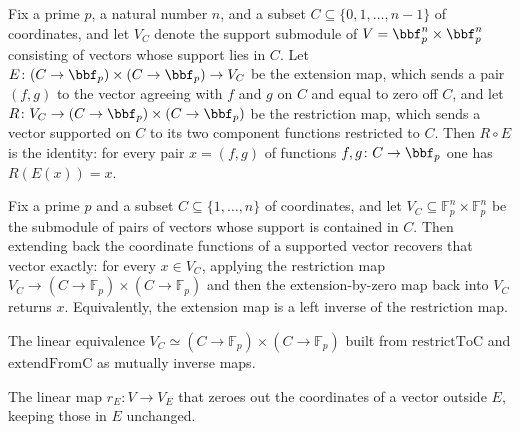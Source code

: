 \begin{lemma}
\label{restrictToC_extendFromC}
\leanok
{}
Fix a prime $p$, a natural number $n$, and a subset $C \subseteq \{0,1,\dots,n-1\}$ of
coordinates, and let $V_C$ denote the support submodule of $V = \bbf_p^n \times
\bbf_p^n$ consisting of vectors whose support lies in $C$. Let $E \colon (C \to \bbf_p)
\times (C \to \bbf_p) \to V_C$ be the extension map, which sends a pair $(f,g)$ to the
vector agreeing with $f$ and $g$ on $C$ and equal to zero off $C$, and let $R \colon V_C
\to (C \to \bbf_p) \times (C \to \bbf_p)$ be the restriction map, which sends a vector
supported on $C$ to its two component functions restricted to $C$. Then $R \circ E$ is
the identity: for every pair $x = (f,g)$ of functions $f, g \colon C \to \bbf_p$ one has
$R(E(x)) = x$.
\end{lemma}

\begin{lemma}
\label{extendFromC_restrictToC}
\leanok
{}
Fix a prime $p$ and a subset $C \subseteq \{1,\dots,n\}$ of coordinates, and let $V_C
\subseteq \mathbb{F}_p^n \times \mathbb{F}_p^n$ be the submodule of pairs of vectors
whose support is contained in $C$. Then extending back the coordinate functions of a
supported vector recovers that vector exactly: for every $x \in V_C$, applying the
restriction map $V_C \to (C \to \mathbb{F}_p) \times (C \to \mathbb{F}_p)$ and then the
extension-by-zero map back into $V_C$ returns $x$. Equivalently, the extension map is a
left inverse of the restriction map.
\end{lemma}

\begin{definition}
\label{V_sub_iso}
\leanok
{}
The linear equivalence $V_C \simeq (C \to \mathbb{F}_p) \times (C \to \mathbb{F}_p)$ built from
$\mathrm{restrictToC}$ and $\mathrm{extendFromC}$ as mutually inverse maps.
\end{definition}

\begin{definition}
\label{r_E}
\leanok
{}
The linear map $r_E : V \to V_E$ that zeroes out the coordinates of a vector outside $E$,
keeping those in $E$ unchanged.
\end{definition}

